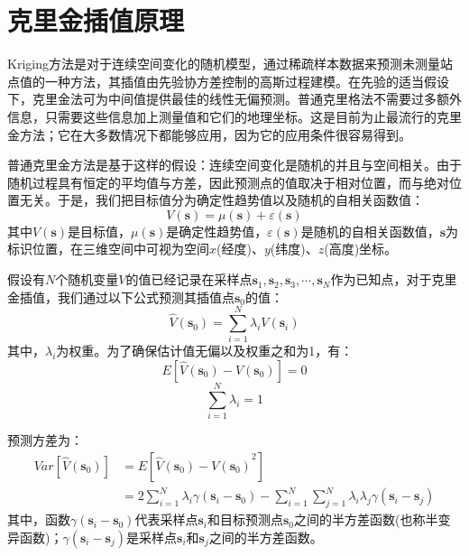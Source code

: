 \section{克里金插值原理}
Kriging方法是对于连续空间变化的随机模型，通过稀疏样本数据来预测未测量站点值的一种方法，其插值由先验协方差控制的高斯过程建模。在先验的适当假设下，克里金法可为中间值提供最佳的线性无偏预测。普通克里格法不需要过多额外信息，只需要这些信息加上测量值和它们的地理坐标。这是目前为止最流行的克里金方法；它在大多数情况下都能够应用，因为它的应用条件很容易得到。

普通克里金方法是基于这样的假设：连续空间变化是随机的并且与空间相关。由于随机过程具有恒定的平均值与方差，因此预测点的值取决于相对位置，而与绝对位置无关。于是，我们把目标值分为确定性趋势值以及随机的自相关函数值：
\begin{equation}
    V\left( \mathbf{s} \right) = \mu\left( \mathbf{s} \right) + \varepsilon\left( \mathbf{s} \right)
    \label{目标值分为确定性数值和随机自相关数值}
\end{equation}
其中$ V\left( \mathbf{s} \right) $是目标值，$ \mu\left( \mathbf{s} \right) $是确定性趋势值，$ \varepsilon\left( \mathbf{s} \right) $是随机的自相关函数值，$ \mathbf{s} $为标识位置，在三维空间中可视为空间$ x $(经度)、$ y $(纬度)、$ z $(高度)坐标。

假设有$ N $个随机变量$ V $的值已经记录在采样点$ \mathbf{s}_{1}, \mathbf{s}_{2}, \mathbf{s}_{3} , \cdots , \mathbf{s}_{N} $作为已知点，对于克里金插值，我们通过以下公式预测其插值点$ \mathbf{s}_{0} $的值：
\begin{equation}
    \hat{V}\left( \mathbf{s}_{0} \right) = \sum_{i=1}^{N} \lambda_{i} V\left( \mathbf{s}_{i} \right)
    \label{点克里金插值公式}
\end{equation}
其中，$ \lambda_{i} $为权重。为了确保估计值无偏以及权重之和为1，有：
\begin{equation}
    E\left[ \hat{V}\left( \mathbf{s}_{0} \right) - V\left( \mathbf{s}_{0} \right) \right] = 0
    \label{点克里金插值无偏}
\end{equation}
\begin{equation}
    \sum_{i=1}^{N} \lambda_{i} = 1
    \label{点克里金插值权重之和为1}
\end{equation}

预测方差为：
\begin{equation}
    \begin{split}
        Var\left[ \hat{V} \left( \mathbf{s}_{0} \right) \right]
        & = E\left[ {\hat{V}\left( \mathbf{s}_{0} \right) - V\left( \mathbf{s}_{0} \right)}^{2} \right]     \\
        & = 2 \sum_{i=1}^{N} \lambda_{i} \gamma\left( \mathbf{s}_{i} - \mathbf{s}_{0} \right) - \sum_{i=1}^{N} \sum_{j=1}^{N} \lambda_{i} \lambda_{j} \gamma\left( \mathbf{s}_{i} - \mathbf{s}_{j} \right)
    \end{split}
    \label{点克里金插值预测方差}
\end{equation}
其中，函数$ \gamma\left( \mathbf{s}_{i} - \mathbf{s}_{0} \right) $代表采样点$ \mathbf{s}_{i} $和目标预测点$ \mathbf{s}_{0} $之间的半方差函数(也称半变异函数)；$ \gamma\left( \mathbf{s}_{i} - \mathbf{s}_{j} \right) $是采样点$ \mathbf{s}_{i} $和$ \mathbf{s}_{j} $之间的半方差函数。

